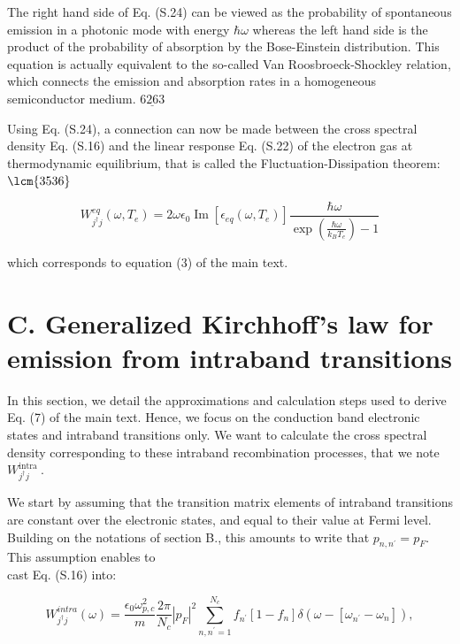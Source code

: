 \documentclass[10pt]{article}
\begin{document}
The right hand side of Eq. (S.24) can be viewed as the probability of spontaneous emission in a photonic mode with energy $\hbar \omega$ whereas the left hand side is the product of the probability of absorption by the Bose-Einstein distribution. This equation is actually equivalent to the so-called Van Roosbroeck-Shockley relation, which connects the emission and absorption rates in a homogeneous semiconductor medium. $\underline{6263}$

Using Eq. (S.24), a connection can now be made between the cross spectral density Eq. (S.16) and the linear response Eq. (S.22) of the electron gas at thermodynamic equilibrium, that is called the Fluctuation-Dissipation theorem: $\lcm{3536}$


\begin{equation*}
W_{j^{\dagger} j}^{e q}\left(\omega, T_{e}\right)=2 \omega \epsilon_{0} \operatorname{Im}\left[\epsilon_{e q}\left(\omega, T_{e}\right)\right] \frac{\hbar \omega}{\exp \left(\frac{\hbar \omega}{k_{B} T_{e}}\right)-1} \tag{S.25}
\end{equation*}


which corresponds to equation (3) of the main text.

\section*{C. Generalized Kirchhoff's law for emission from intraband transitions}
In this section, we detail the approximations and calculation steps used to derive Eq. (7) of the main text. Hence, we focus on the conduction band electronic states and intraband transitions only. We want to calculate the cross spectral density corresponding to these intraband recombination processes, that we note $W_{j^{\dagger} j}^{\text {intra }}$.

We start by assuming that the transition matrix elements of intraband transitions are constant over the electronic states, and equal to their value at Fermi level. Building on the notations of section B., this amounts to write that $p_{n, n^{\prime}}=p_{F}$. This assumption enables to\\
cast Eq. (S.16) into:


\begin{equation*}
W_{j^{\dagger} j}^{i n t r a}(\omega)=\frac{\epsilon_{0} \omega_{p, c}^{2}}{m} \frac{2 \pi}{N_{c}}\left|p_{F}\right|^{2} \sum_{n, n^{\prime}=1}^{N_{c}} f_{n^{\prime}}\left[1-f_{n}\right] \delta\left(\omega-\left[\omega_{n^{\prime}}-\omega_{n}\right]\right), \tag{S.26}
\end{equation*}
\end{document}
